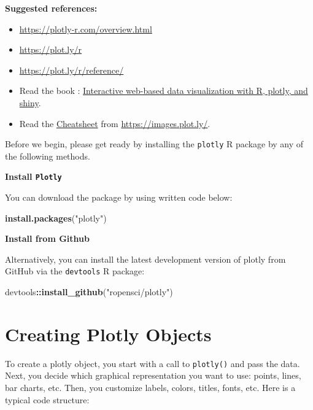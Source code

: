 \documentclass[]{book}
\newenvironment{Shaded}{\begin{snugshade}}{\end{snugshade}}
\newcommand{\KeywordTok}[1]{\textcolor[rgb]{0.13,0.29,0.53}{\textbf{#1}}}
\newcommand{\StringTok}[1]{\textcolor[rgb]{0.31,0.60,0.02}{#1}}
\newcommand{\OperatorTok}[1]{\textcolor[rgb]{0.81,0.36,0.00}{\textbf{#1}}}
\newcommand{\NormalTok}[1]{#1}
\providecommand{\tightlist}{%
  \setlength{\itemsep}{0pt}\setlength{\parskip}{0pt}}
\begin{document}
\textbf{Suggested references:}

\begin{itemize}
\tightlist
\item
  \url{https://plotly-r.com/overview.html}
\item
  \url{https://plot.ly/r}
\item
  \url{https://plot.ly/r/reference/}
\item
  Read the book \citet{Sievert2020}:
  \href{https://plotly-r.com}{Interactive web-based data visualization
  with R, plotly, and shiny}.
\item
  Read the
  \href{https://images.plot.ly/plotly-documentation/images/plotly_js_cheat_sheet.pdf?_ga=2.148726517.312656595.1565006727-1010438718.1562929967}{Cheatsheet}
  from \url{https://images.plot.ly/}.
\end{itemize}

Before we begin, please get ready by installing the \texttt{plotly} R
package by any of the following methods.

\textbf{Install \texttt{Plotly}}

You can download the package by using written code below:

\begin{Shaded}
\begin{Highlighting}[]
\KeywordTok{install.packages}\NormalTok{(}\StringTok{"plotly"}\NormalTok{)}
\end{Highlighting}
\end{Shaded}

\textbf{Install from Github}

Alternatively, you can install the latest development version of plotly
from GitHub via the \texttt{devtools} R package:

\begin{Shaded}
\begin{Highlighting}[]
\NormalTok{devtools}\OperatorTok{::}\KeywordTok{install_github}\NormalTok{(}\StringTok{"ropensci/plotly"}\NormalTok{)}
\end{Highlighting}
\end{Shaded}

\section{Creating Plotly Objects}\label{creating-plotly-objects}

To create a plotly object, you start with a call to \texttt{plotly()}
and pass the data. Next, you decide which graphical representation you
want to use: points, lines, bar charts, etc. Then, you customize labels,
colors, titles, fonts, etc. Here is a typical code structure:
\end{document}

